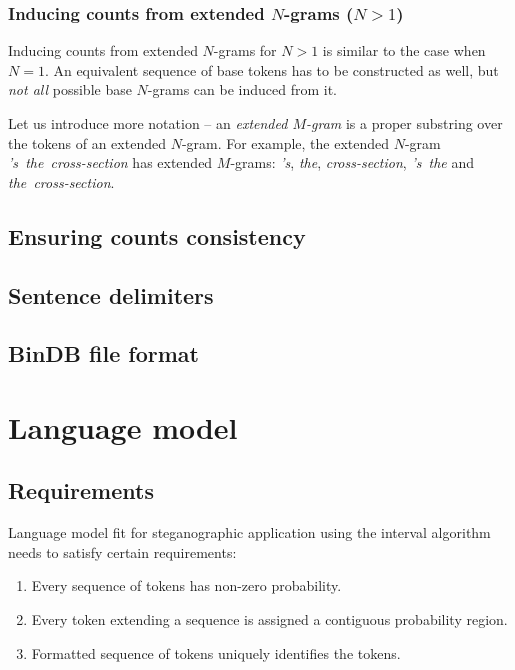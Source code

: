 \documentclass{IIBproject}
\DeclareRobustCommand{\ngram}[1]{\mbox{\emph{#1}}}
\begin{document}
\subsubsection{Inducing counts from extended $N$-grams ($N > 1$)}

Inducing counts from extended $N$-grams for $N>1$ is similar to the case when $N=1$. An equivalent sequence of base tokens has to be constructed as well, but \emph{not all} possible base $N$-grams can be induced from it.

Let us introduce more notation -- an \emph{extended $M$-gram} is a proper substring over the tokens of an extended $N$-gram. For example, the extended $N$-gram \ngram{'s the cross-section} has extended $M$-grams: \ngram{'s}, \ngram{the}, \ngram{cross-section}, \ngram{'s the} and \ngram{the cross-section}.

\subsection{Ensuring counts consistency}

\subsection{Sentence delimiters}

\subsection{BinDB file format}

\section{Language model}

\subsection{Requirements}
\label{eq:lm_requirements}

Language model fit for steganographic application using the interval algorithm needs to satisfy certain requirements:

\begin{enumerate}
  \item \label{lm_req:non_zero_probability} Every sequence of tokens has non-zero probability.
  \item \label{lm_req:contiguous_probability} Every token extending a sequence is assigned a contiguous probability region.
  \item \label{lm_req:hidden_symbols} Formatted sequence of tokens uniquely identifies the tokens.
\end{enumerate}
\end{document}
